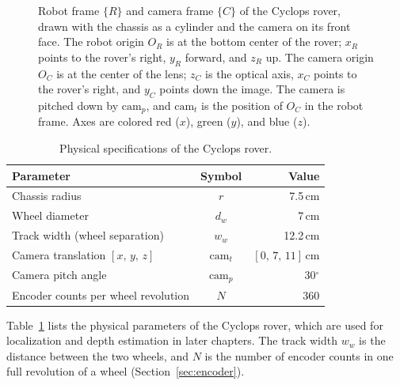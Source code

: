 \begin{figure}[htbp]
  \centering
  
  \caption[Robot and camera coordinate frames of the Cyclops rover]{Robot frame $\{R\}$
    and camera frame $\{C\}$ of the Cyclops rover, drawn with the chassis as a cylinder
    and the camera on its front face. The robot origin $O_R$ is at the bottom center of
    the rover; $x_R$ points to the rover's right, $y_R$ forward, and $z_R$ up. The camera
    origin $O_C$ is at the center of the lens; $z_C$ is the optical axis, $x_C$ points to
    the rover's right, and $y_C$ points down the image. The camera is pitched down by
    $\mathrm{cam}_p$, and $\mathrm{cam}_t$ is the position of $O_C$ in the robot frame.
    Axes are colored red ($x$), green ($y$), and blue ($z$).}
  \label{fig:rover-frame}
\end{figure}


\begin{table}[htbp]
  \centering
  \caption{Physical specifications of the Cyclops rover.}
  \label{tab:rover-specs}
  \small
  \begin{tabular}{l c r}
    \hline
    Parameter & Symbol & Value \\
    \hline
    Chassis radius & $r$ & 7.5\,cm \\
    Wheel diameter & $d_w$ & 7\,cm \\
    Track width (wheel separation) & $w_w$ & 12.2\,cm \\
    Camera translation $[x,\,y,\,z]$ & $\mathrm{cam}_t$ & $[0,\,7,\,11]$\,cm \\
    Camera pitch angle & $\mathrm{cam}_p$ & 30$^\circ$ \\
    Encoder counts per wheel revolution & $N$ & 360 \\
    \hline
  \end{tabular}
\end{table}

Table~\ref{tab:rover-specs} lists the physical parameters of the Cyclops rover, which are
used for localization and depth estimation in later chapters. The track width $w_w$ is the
distance between the two wheels, and $N$ is the number of encoder counts in one full
revolution of a wheel (Section~\ref{sec:encoder}).

